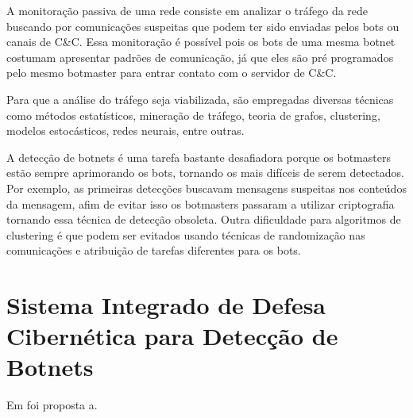 A monitoração passiva de uma rede consiste em analizar o tráfego da rede buscando por comunicações suspeitas que podem ter sido enviadas pelos bots ou canais de C\&C. Essa monitoração é possível pois os bots de uma mesma botnet costumam apresentar padrões de comunicação, já que eles são pré programados pelo mesmo botmaster para entrar contato com o servidor de C\&C.

Para que a análise do tráfego seja viabilizada, são empregadas diversas técnicas como métodos estatísticos, mineração de tráfego, teoria de grafos, clustering, modelos estocásticos, redes neurais, entre outras.

A detecção de botnets é uma tarefa bastante desafiadora porque os botmasters estão sempre aprimorando os bots, tornando os mais difíceis de serem detectados. Por exemplo, as primeiras detecções buscavam mensagens suspeitas nos conteúdos da mensagem, afim de evitar isso os botmasters passaram a utilizar criptografia tornando essa técnica de detecção obsoleta. Outra dificuldade para algoritmos de clustering é que podem ser evitados usando técnicas de randomização nas comunicações e atribuição de tarefas diferentes para os bots.

\section{Sistema Integrado de Defesa Cibernética para Detecção de Botnets}
Em \cite{silva2012arquitetura} foi proposta a.
